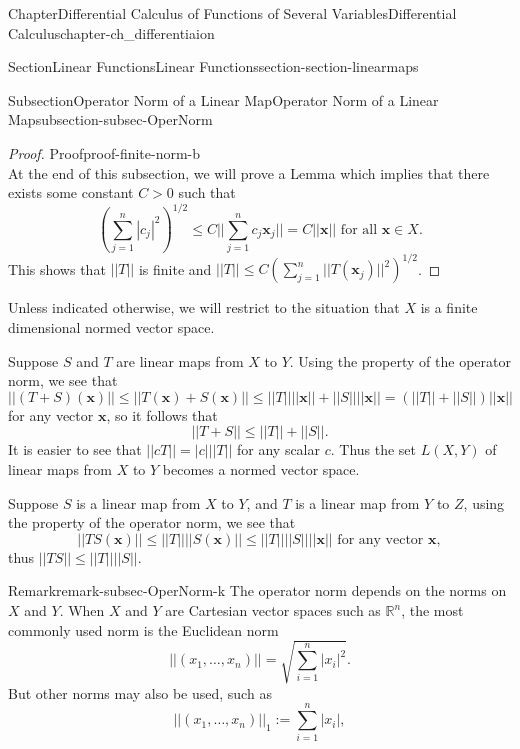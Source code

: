 \documentclass[oneside,10pt,]{book}
\numberwithin{equation}{section}
\newcommand{\bx}{\mathbf{x}}
\begin{document}
\begin{chapterptx}{Chapter}{Differential Calculus of Functions of Several Variables}{}{Differential Calculus}{}{}{chapter-ch_differentiaion}
\begin{sectionptx}{Section}{Linear Functions}{}{Linear Functions}{}{}{section-section-linearmaps}
\begin{subsectionptx}{Subsection}{Operator Norm of a Linear Map}{}{Operator Norm of a Linear Map}{}{}{subsection-subsec-OperNorm}
\begin{proof}{Proof}{}{proof-finite-norm-b}
\begin{equation*}
\end{equation*}
At the end of this subsection, we will prove a Lemma which implies that there exists some constant \(C>0\) such that%
\begin{equation*}
\left( \sum_{j=1}^{n}|c_{j}|^{2}\right)^{1/2} \le C|| \sum_{j=1}^{n}c_{j} {\mathbf x}_{j}||=C||{\mathbf x}||
\text{ for all $\bx \in X$}.
\end{equation*}
This shows that \(||T||\) is finite and \(||T||\le C \left( \sum_{j=1}^{n}|| T({\mathbf x}_{j})||^{2}\right)^{1/2}\).\end{proof}
Unless indicated otherwise, we will restrict to the situation that \(X\) is a finite dimensional normed vector space.%
\par
Suppose \(S\) and \(T\) are  linear maps from \(X\) to  \(Y\). Using the property of the operator norm, we see that%
\begin{equation*}
||(T+S)({\mathbf x})||\le|| T ({\mathbf x}) + S ({\mathbf x})|| \le ||T|| || {\mathbf x}||+||S|| ||{\mathbf x}||
=\left(||T||+||S||\right) ||{\mathbf x}||
\end{equation*}
for any vector \({\mathbf x}\), so it follows that%
\begin{equation*}
||T+S||\le ||T||+||S||.
\end{equation*}
It is easier to see that \(||cT||=|c| ||T||\) for any scalar \(c\). Thus the set \(L(X, Y)\) of linear maps from \(X\) to  \(Y\) becomes a normed vector space.%
\par
Suppose \(S\) is a linear map from \(X\) to  \(Y\), and \(T\) is a linear map from \(Y\) to  \(Z\), using the property of the operator norm, we see that%
\begin{equation*}
||TS({\mathbf x})||\le ||T|| ||S({\mathbf x})||\le ||T|| ||S|| ||{\mathbf x}|| \text{ for any vector } {\mathbf x},
\end{equation*}
thus \(||TS||\le  ||T|| ||S||\).%
\begin{remark}{Remark}{}{remark-subsec-OperNorm-k}%
The operator norm depends on the norms on \(X\) and \(Y\). When \(X\) and \(Y\) are Cartesian vector spaces such as \(\mathbb R^{n}\), the most commonly used norm is the Euclidean norm%
\begin{equation*}
||(x_{1}, \ldots, x_{n})||=\sqrt{\sum_{i=1}^{n}|x_{i}|^{2}}.
\end{equation*}
But other norms may also be used, such as%
\begin{equation*}
||(x_{1}, \ldots, x_{n})||_{1} := \sum_{i=1}^{n}|x_{i}|,
\end{equation*}

\end{remark}
\end{subsectionptx}
\end{sectionptx}
\end{chapterptx}
\end{document}
